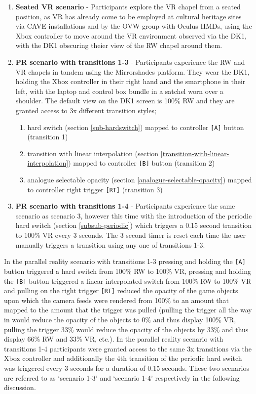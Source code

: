 \begin{enumerate}
	\item \textbf{Seated VR scenario} - Participants explore the VR chapel from a seated position, as VR has already come to be employed at cultural heritage sites via CAVE installations and by the OVW group with Oculus HMDs, using the Xbox controller to move around the VR environment observed via the DK1, with the DK1 obscuring theier view of the RW chapel around them.
	\item \textbf{PR scenario with transitions 1-3} - Participants experience the RW and VR chapels in tandem using the Mirrorshades platform. They wear the DK1, holding the Xbox controller in their right hand and the smartphone in their left, with the laptop and control box bundle in a satchel worn over a shoulder. The default view on the DK1 screen is 100\% RW and they are granted access to 3x different transition styles;
	\begin{enumerate}
		\item hard switch (section \ref{sub-hardswitch}) mapped to controller \texttt{[A]} button (transition 1)
		\item transition with linear interpolation (section \ref{transition-with-linear-interpolation}) mapped to controller \texttt{[B]} button (transition 2)
		\item analogue selectable opacity (section \ref{analogue-selectable-opacity}) mapped to controller right trigger \texttt{[RT]} (transition 3)
\end{enumerate}
	\item \textbf{PR scenario with transitions 1-4} - Participants experience the same scenario as scenario 3, however this time with the introduction of the periodic hard switch (section \ref{subsub-periodic}) which triggers a 0.15 second transition to 100\% VR every 3 seconds. The 3 second timer is reset each time the user manually triggers a transition using any one of transitions 1-3.
\end{enumerate}

In the parallel reality scenario with transitions 1-3 pressing and holding the \texttt{[A]} button triggered a hard switch from 100\% RW to 100\% VR, pressing and holding the \texttt{[B]} button triggered a linear interpolated switch from 100\% RW to 100\% VR and pulling on the right trigger \texttt{[RT]} reduced the opacity of the game objects upon which the camera feeds were rendered from 100\% to an amount that mapped to the amount that the trigger was pulled (pulling the trigger all the way in would reduce the opacity of the objects to 0\% and thus display 100\% VR, pulling the trigger 33\% would reduce the opacity of the objects by 33\% and thus display 66\% RW and 33\% VR, etc.). In the parallel reality scenario with transitions 1-4 participants were granted access to the same 3x transitions via the Xbox controller and additionally the 4th transition of the periodic hard switch was triggered every 3 seconds for a duration of 0.15 seconds. These two scenarios are referred to as `scenario 1-3' and `scenario 1-4' respectively in the following discussion.

